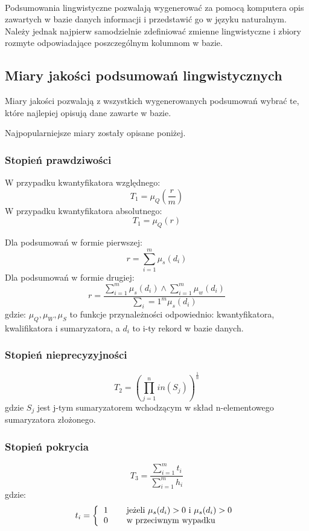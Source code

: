 \documentclass{classrep}
\begin{document}
\paragraph{}
Podsumowania lingwistyczne pozwalają wygenerować za pomocą komputera opis zawartych w bazie danych informacji i przedstawić go w języku naturalnym. Należy jednak najpierw samodzielnie zdefiniować zmienne lingwistyczne i zbiory rozmyte odpowiadające poszczególnym kolumnom w bazie. 

\subsection{Miary jakości podsumowań lingwistycznych}
Miary jakości pozwalają z wszystkich wygenerowanych podsumowań wybrać te, które najlepiej opisują dane zawarte w bazie.

Najpopularniejsze miary zostały opisane poniżej.
\subsubsection{Stopień prawdziwości}
W przypadku kwantyfikatora względnego:
\begin{equation}
T_1 =\mu_Q(\frac{r}{m})
\end{equation}
W przypadku kwantyfikatora absolutnego:
\begin{equation}
T_1 =\mu_Q(r)
\end{equation}

Dla podsumowań w formie pierwszej:
$$r=\sum_{i=1}^m \mu_s(d_i)$$
Dla podsumowań w formie drugiej:
$$r=\frac{\sum_{i=1}^m \mu_s(d_i) \wedge \sum_{i=1}^m \mu_w(d_i)}{\sum_i=1^m \mu_s(d_i)}$$
gdzie:
$\mu_Q, \mu_W, \mu_S$ to funkcje przynależności odpowiednio: kwantyfikatora, kwalifikatora i sumaryzatora, a $d_i$ to i-ty rekord w bazie danych. 

\subsubsection{Stopień nieprecyzyjności}
\begin{equation}
T_2=(\prod_{j=1}^n in(S_j))^{\frac{1}{n}}
\end{equation}
gdzie $S_j$ jest j-tym sumaryzatorem wchodzącym w skład n-elementowego sumaryzatora złożonego.  

\subsubsection{Stopień pokrycia}
\begin{equation}
T_3=\frac{\sum_{i=1}^m t_i}{\sum_{i=1}^m h_i}
\end{equation}
gdzie:\\
\begin{equation}
t_i = \left\{
\begin{tabular}{l l}
1 & \quad \mbox{jeżeli $\mu_s(d_i) > 0$ i $\mu_s(d_i) > 0$}\\
 0 & \quad \mbox{w przeciwnym wypadku}\\ 
\end{tabular} \right .
\end{equation}
\end{document}
